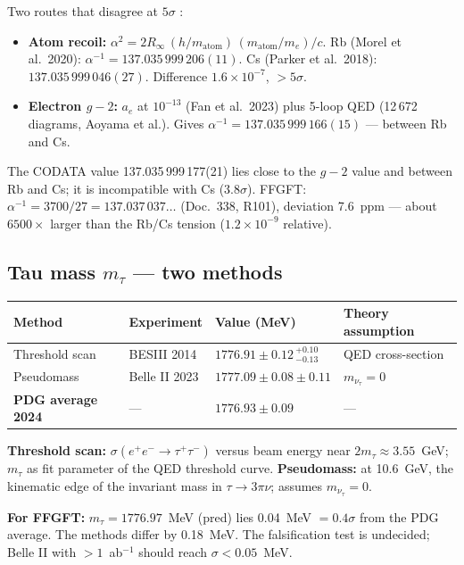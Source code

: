 Two routes that disagree at $5\sigma$ \QM:
\begin{itemize}\itemsep2pt
\item \textbf{Atom recoil:} $\alpha^2=2R_\infty\,(h/m_\text{atom})\,(m_\text{atom}/m_e)/c$. Rb (Morel et al.\ 2020): $\alpha^{-1}=137.035\,999\,206(11)$. Cs (Parker et al.\ 2018): $137.035\,999\,046(27)$. Difference $1.6\times10^{-7}$, $>5\sigma$.
\item \textbf{Electron $g-2$:} $a_e$ at $10^{-13}$ (Fan et al.\ 2023) plus 5-loop QED (12\,672 diagrams, Aoyama et al.). Gives $\alpha^{-1}=137.035\,999\,166(15)$ --- between Rb and Cs.
\end{itemize}
The CODATA value 137.035\,999\,177(21) lies close to the $g-2$ value and between Rb and Cs; it is incompatible with Cs ($3.8\sigma$). FFGFT: $\alpha^{-1}=3700/27=137.037\,037\ldots$ (Doc.~338, R101), deviation 7.6~ppm --- about $6500\times$ larger than the Rb/Cs tension ($1.2\times10^{-9}$ relative).

\subsection{Tau mass $m_\tau$ --- two methods}

\begin{center}
\begin{tabular}{@{}llll@{}}
\toprule
Method & Experiment & Value (MeV) & Theory assumption \\
\midrule
Threshold scan & BESIII 2014 & $1776.91\pm0.12\,{}^{+0.10}_{-0.13}$ & QED cross-section \\
Pseudomass & Belle II 2023 & $1777.09\pm0.08\pm0.11$ & $m_{\nu_\tau}=0$ \\
\textbf{PDG average 2024} & --- & $\mathbf{1776.93\pm0.09}$ & --- \\
\bottomrule
\end{tabular}
\end{center}

\textbf{Threshold scan:} $\sigma(e^+e^-\to\tau^+\tau^-)$ versus beam energy near $2m_\tau\approx3.55$~GeV; $m_\tau$ as fit parameter of the QED threshold curve. \textbf{Pseudomass:} at 10.6~GeV, the kinematic edge of the invariant mass in $\tau\to3\pi\nu$; assumes $m_{\nu_\tau}=0$.

\textbf{For FFGFT:} $m_\tau=1776.97$~MeV (pred) lies 0.04~MeV $=0.4\sigma$ from the PDG average. The methods differ by 0.18~MeV. The falsification test is undecided; Belle II with $>1$~ab$^{-1}$ should reach $\sigma<0.05$~MeV.

